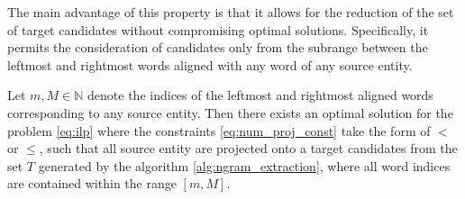 The main advantage of this property is that it allows for the reduction of the set of
target candidates without compromising optimal solutions. Specifically, it permits
the consideration of candidates only from the subrange between the leftmost and
rightmost words aligned with any word of any source entity.
\begin{theorem}
  Let \( m, M \in \mathbb{N} \) denote the indices of the leftmost and rightmost
  aligned words corresponding to any source entity. Then there exists
  an optimal solution for the problem \eqref{eq:ilp} where the constraints
  \eqref{eq:num_proj_const} take the form of \( < \) or \( \leq \), such that
  all source entity are projected onto a target candidates from the set \( T \)
  generated by the algorithm \ref{alg:ngram_extraction}, where all word indices
  are contained within the range \( [m, M] \).
\end{theorem}
